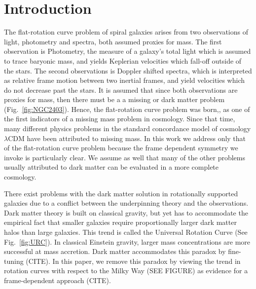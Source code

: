 \documentclass[reprint,%
 amsmath,amssymb,
 aps,
]{revtex4-1}
\begin{document}
\maketitle




\section{Introduction  \label{sec:uno}}

 The flat-rotation curve problem of spiral galaxies   arises from two   observations of light, photometry and spectra, both assumed proxies for mass. The first observation is Photometry,  the measure of a galaxy's total light which is assumed to trace baryonic mass,  and yields Keplerian velocities which fall-off   outside of the stars. 
    The second observations is Doppler shifted spectra, which is interpreted as   relative frame motion between two inertial frames, and yield velocities which do not decrease past the stars.
 It is assumed that since both observations are proxies for mass, then  there must be a 
    a missing or dark matter problem  (Fig.~\ref{fig:NGC2403}).   Hence,  the     flat-rotation curve problem was born\cite{Rub},\cite{Bosma},\cite{Zwick} as one of the first indicators of a missing mass problem in cosmology. Since that time, many different physics problems in the standard concordance model of cosmology  $\lambda$CDM have been attributed to missing mass. In this work we address only that of the flat-rotation curve problem because  the frame dependent symmetry we invoke is particularly clear. We assume as well that many of the other problems usually attributed to dark matter can be evaluated in a more complete cosmology.
    
 
    There exist problems with the dark matter solution in rotationally supported galaxies due to a conflict between the underpinning theory and the observations.  Dark matter theory is built on classical gravity,   but yet has  to accommodate the empirical fact that smaller galaxies require proportionally larger dark matter halos than large galaxies. This trend is called the Universal Rotation Curve  (See Fig.~\ref{fig:URC}).
     In classical Einstein gravity, larger mass concentrations are more successful at mass accretion. Dark matter accommodates this paradox  by fine-tuning (CITE). In this paper, we remove this paradox by  viewing the trend in rotation curves with respect to the Milky Way (SEE FIGURE) as evidence for a frame-dependent approach (CITE).  
    
\end{document}
